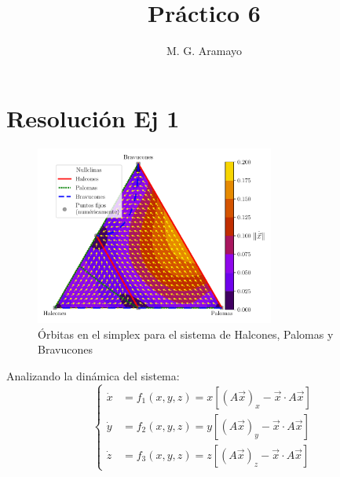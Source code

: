 \documentclass[twocolumn,aps,prl]{revtex4-1}
\begin{document}

\title{Práctico 6}
\author{M. G. Aramayo}


\maketitle

\section{Resolución Ej 1}


\begin{figure}[ht!]
    \centering
        \includegraphics[width = 0.7\textwidth]{figuras/ex01-a.pdf}
    \caption{Órbitas en el simplex para el sistema de Halcones, Palomas y Bravucones}
    \label{fig:figuras/ex01-a}
\end{figure}


Analizando la dinámica del sistema:
$$ \left\lbrace
\begin{aligned}
  \dot{x} &= f_1(x,y,z) = x \left[(A \vec{x})_{x}-\vec{x} \cdot A \vec{x}\right] \\
  \dot{y} &= f_2(x,y,z) = y \left[(A \vec{x})_{y}-\vec{x} \cdot A \vec{x}\right] \\
  \dot{z} &= f_3(x,y,z) = z \left[(A \vec{x})_{z}-\vec{x} \cdot A \vec{x}\right]
\end{aligned}
\right.
$$
\end{document}
